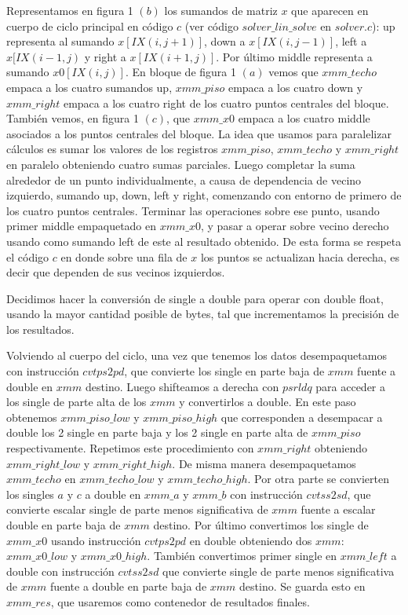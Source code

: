 \par Representamos en figura 1 $(b)$ los sumandos de matriz $x$ que aparecen en cuerpo de ciclo principal en código $c$ (ver código $solver\_lin\_solve$ en $solver.c$): up representa al sumando $x[IX(i,j+1)]$, down a $x[IX(i,j-1)]$, left a $x[IX(i-1,j)$ y right a $x[IX(i+1,j)]$. Por último middle representa a sumando $x0[IX(i,j)]$. En bloque de figura 1 $(a)$ vemos que $xmm\_techo$ empaca a los cuatro sumandos up, $xmm\_piso$ empaca a los cuatro down y $xmm\_right$ empaca a los cuatro right de los cuatro puntos centrales del bloque. También vemos, en figura 1 $(c)$, que $xmm\_x0$ empaca a los cuatro middle asociados a los puntos centrales del bloque. La idea que usamos para paralelizar cálculos es sumar los valores de los registros $xmm\_piso$, $xmm\_techo$ y $xmm\_right$ en paralelo obteniendo cuatro sumas parciales. Luego completar la suma alrededor de un punto individualmente, a causa de dependencia de vecino izquierdo, sumando up, down, left y right, comenzando con entorno de primero de los cuatro puntos centrales. Terminar las operaciones sobre ese punto, usando primer middle empaquetado en $xmm\_x0$, y pasar a operar sobre vecino derecho usando como sumando left de este al resultado obtenido. De esta forma se respeta el código $c$ en donde sobre una fila de $x$ los puntos se actualizan hacia derecha, es decir que dependen de sus vecinos izquierdos.\newline
\par Decidimos hacer la conversión de single a double para operar con double float, usando la mayor cantidad posible de bytes, tal que incrementamos la precisión de los resultados.\newline
\par Volviendo al cuerpo del ciclo, una vez que tenemos los datos desempaquetamos con instrucción $cvtps2pd$, que convierte los single en parte baja de $xmm$ fuente a double en $xmm$ destino. Luego shifteamos a derecha con $psrldq$ para acceder a los single de parte alta de los $xmm$ y convertirlos a double.  En este paso obtenemos $xmm\_piso\_low$ y $xmm\_piso\_high$ que corresponden a desempacar a double los 2 single en parte baja y los 2 single en parte alta de $xmm\_piso$ respectivamente. Repetimos este procedimiento con $xmm\_right$ obteniendo $xmm\_right\_low$ y $xmm\_right\_high$. De misma manera desempaquetamos $xmm\_techo$ en $xmm\_techo\_low$ y $xmm\_techo\_high$. Por otra parte se convierten los singles $a$ y $c$ a double en $xmm\_a$ y $xmm\_b$ con instrucción $cvtss2sd$, que convierte escalar single de parte menos significativa de $xmm$ fuente a escalar double en parte baja de $xmm$ destino. Por último convertimos los single de $xmm\_x0$ usando instrucción $cvtps2pd$ en double obteniendo dos $xmm$: $xmm\_x0\_low$ y $xmm\_x0\_high$. También convertimos primer single en $xmm\_left$ a double con instrucción $cvtss2sd$ que convierte single de parte menos significativa de $xmm$ fuente a double en parte baja de $xmm$ destino. Se guarda esto en $xmm\_res$, que usaremos como contenedor de resultados finales.\newline

